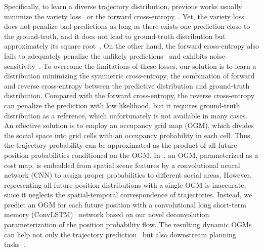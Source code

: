 \documentclass[10pt,twocolumn,letterpaper]{article}
\begin{document}
Specifically, to learn a diverse trajectory distribution, previous works usually minimize the variety loss~\cite{gupta2018social,huang2019stgat,deo2020trajectory} or the forward cross-entropy~\cite{makansi2019overcoming,salzmann2020trajectron++,liang2020garden}. Yet, the variety loss does not penalize bad predictions as long as there exists one prediction close to the ground-truth, and it does not lead to ground-truth distribution but approximately its square root~\cite{thiede2019analyzing}. On the other hand, the forward cross-entropy also fails to adequately penalize the unlikely predictions~\cite{rhinehart2018r2p2,park2020diverse} and exhibits noise sensitivity~\cite{wang2019symmetric}. To overcome the limitations of these losses, our solution is to learn a distribution minimizing the symmetric cross-entropy, \ie the combination of forward and reverse cross-entropy between the predictive distribution and ground-truth distribution. Compared with the forward cross-entropy, the reverse cross-entropy can penalize the prediction with low likelihood, but it requires ground-truth distribution as a reference, which unfortunately is not available in many cases. An effective solution is to employ an occupancy grid map (OGM), which divides the social space into grid cells with an occupancy probability in each cell. Thus, the trajectory probability can be approximated as the product of all future position probabilities conditioned on the OGM. In~\cite{rhinehart2018r2p2}, an OGM, parameterized as a cost map, is embedded from spatial scene features by a convolutional neural network (CNN) to assign proper probabilities to different social areas. However, representing all future position distributions with a single OGM is inaccurate, since it neglects the spatial-temporal correspondence of trajectories. Instead, we predict an OGM for each future position with a convolutional long short-term memory (ConvLSTM)~\cite{xingjian2015convolutional} network based on our novel deconvolution parameterization of the position probability flow. The resulting dynamic OGMs can help not only the trajectory prediction~\cite{liang2020garden} but also downstream planning tasks~\cite{zeng2019end,casas2021mp3}.
\end{document}
